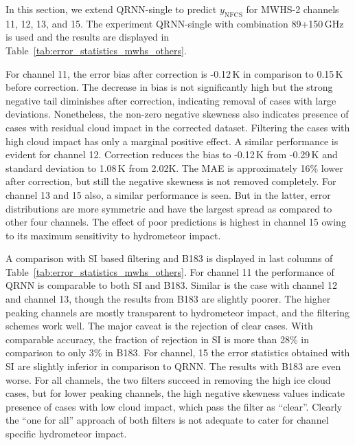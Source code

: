 \documentclass[amt, manuscript]{copernicus}
\newcommand{\ynfcs}{y_\text{NFCS}}
\begin{document}
In this section, we extend QRNN-single to predict $\ynfcs$ for MWHS-2 channels 11, 12, 13, and 15. The experiment QRNN-single with combination 89+150\,GHz is used and the results are displayed in Table~\ref{tab:error_statistics_mwhs_others}.

For channel 11, the error bias after correction is  -0.12\,K in comparison to 0.15\,K before correction. The decrease in bias is not significantly high but the strong negative tail  diminishes after correction, indicating removal of cases with large deviations. Nonetheless, the non-zero negative skewness also indicates presence of cases with residual cloud impact in the corrected dataset. Filtering the cases with high cloud impact has only a marginal positive effect. A similar performance is evident for channel 12. Correction reduces the bias to -0.12\,K from -0.29\,K and standard deviation to 1.08\,K from 2.02\.K. The MAE is approximately 16\% lower after correction, but still the negative skewness is not removed completely. For channel 13 and 15 also, a similar performance is seen. But in the latter, error distributions are more symmetric and have the largest spread as compared to other four channels. The effect of poor predictions is highest in channel 15 owing to its maximum sensitivity to hydrometeor impact.

A comparison with SI based filtering and B183 is displayed in last columns of Table~\ref{tab:error_statistics_mwhs_others}. For channel 11 the performance of QRNN is comparable to both SI and B183. Similar is the case with channel 12 and channel 13, though the results from B183 are slightly poorer. The higher peaking channels are mostly transparent to hydrometeor impact, and the filtering schemes work well. The major caveat is the rejection of clear cases. With comparable accuracy, the fraction of rejection in SI is more than 28\% in comparison to only 3\% in B183. For channel, 15 the error statistics obtained with SI are slightly inferior in comparison to QRNN. The results with B183 are even worse. For all channels, the two filters succeed in removing the high ice cloud cases, but for lower peaking channels, the high negative skewness values indicate presence of cases with low cloud impact, which pass the filter as ``clear''. Clearly the ``one for all'' approach of both filters is not adequate to cater for channel specific hydrometeor impact.  
\end{document}
